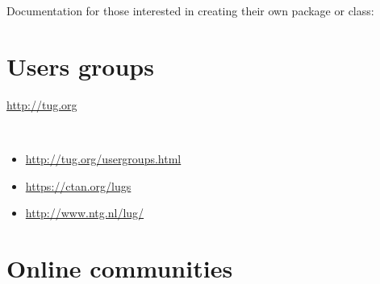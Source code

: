 \documentclass{article}
\def\TeX{TeX}%
\renewcommand*{\TeX}{TeX}
\begin{document}
Documentation for those interested in creating their own package or class:

\printbibliography[
    heading=none,
    category=creating,
]


\section{Users groups}
\label{sec:groups}

\begin{description}[style=unboxed]
\item[\TeX\ Users Group:] \url{http://tug.org}
\item[Lists of international users groups:] \
    \begin{itemize}
    \item \url{http://tug.org/usergroups.html}
    \item \url{https://ctan.org/lugs}
    \item \url{http://www.ntg.nl/lug/}
    \end{itemize}
\end{description}

\section{Online communities}
\label{sec:online}
\end{document}
